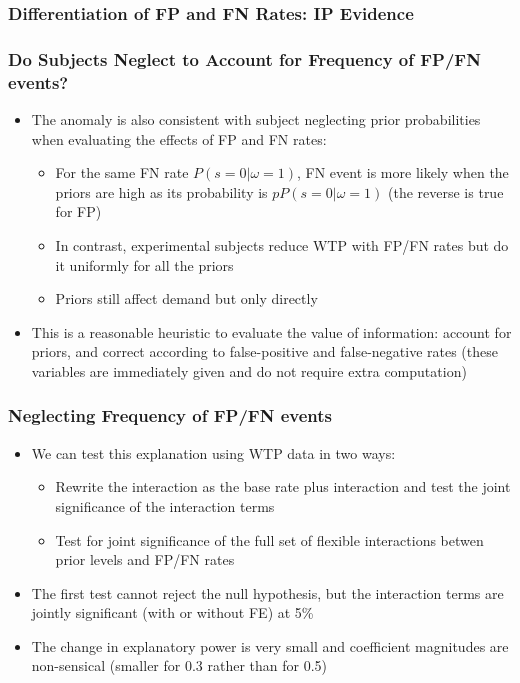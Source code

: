 \documentclass[11pt,hyperref={bookmarks=false}]{beamer}
\begin{document}
\begin{frame}
\frametitle{Differentiation of FP and FN Rates: IP Evidence}
\scriptsize

\end{frame}




\begin{frame}
\frametitle{Do Subjects Neglect to Account for Frequency of FP/FN events?}
\begin{itemize}
\item The anomaly is also consistent with subject neglecting prior probabilities when evaluating the effects of FP and FN rates:
\begin{itemize}
\item For the same FN rate $P(s=0|\omega=1)$, FN event is more likely when the priors are high as its probability is $pP(s=0|\omega=1)$ (the reverse is true for FP)
\item In contrast, experimental subjects reduce WTP with FP/FN rates but do it uniformly for all the priors
\item Priors still affect demand but only directly
\end{itemize}
\item This is a reasonable heuristic to evaluate the value of information: account for priors, and correct according to false-positive and false-negative rates (these variables are immediately given and do not require extra computation)
\end{itemize}
\end{frame}



\begin{frame}
\frametitle{Neglecting Frequency of FP/FN events}
\begin{itemize}
\item We can test this explanation using WTP data in two ways:
\begin{itemize}
\item Rewrite the interaction as the base rate plus interaction and test the joint significance of the interaction terms
\item Test for joint significance of the full set of flexible interactions betwen prior levels and FP/FN rates
\end{itemize}
\item The first test cannot reject the null hypothesis, but the interaction terms are jointly significant (with or without FE) at 5\%
\item The change in explanatory power is very small and coefficient magnitudes are non-sensical (smaller for 0.3 rather than for 0.5)
\end{itemize}
\end{frame}
\end{document}
